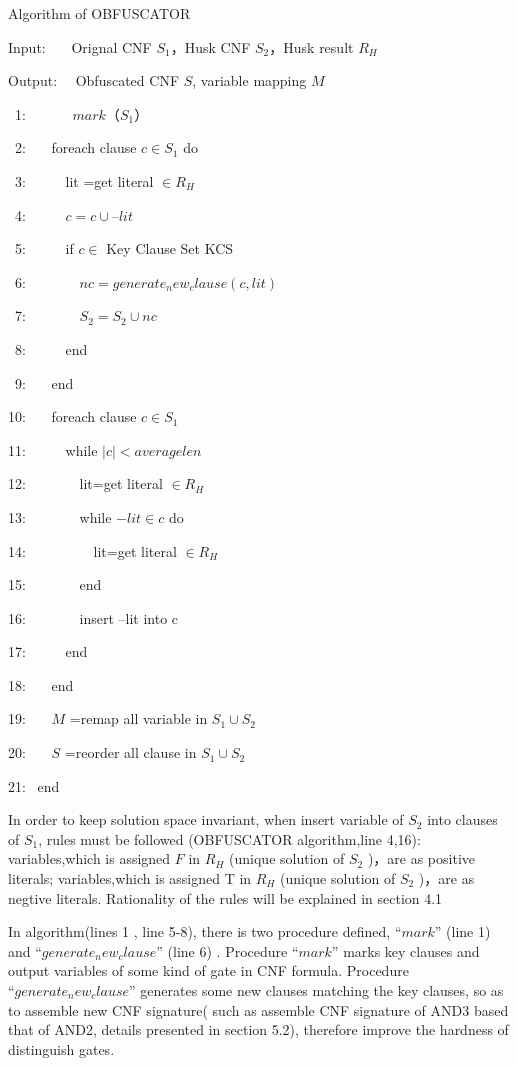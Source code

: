 \documentclass[runningheads,a4paper]{llncs}
\begin{document}
\noindent Algorithm of OBFUSCATOR

Input:~~~ Orignal CNF $S_1$，Husk CNF $S_2$，Husk result $R_H$

Output:~~ Obfuscated CNF $S$, variable mapping $M$ 


~1:~~~~~~   $mark（S_1）$


~2:~~~  foreach clause $c \in S_1$  do

~3:~~~~~      lit =get literal $ \in R_H$

~4:~~~~~      $c=c \cup –lit$


~5:~~~~~         if  $c \in$  Key Clause Set KCS

~6:~~~~~~~           $nc=generate_new_clause(c,lit)$

~7:~~~~~~~           $S_2=S_2 \cup nc$

~8:~~~~~         end  


~9:~~~  end 

10:~~~  foreach clause $ c \in S_1 $

11:~~~~~	    while $ |c| < averagelen $ 

12:~~~~~~~    	 lit=get literal $\in R_H$

13:~~~~~~~    	 while $-lit \in c$ do

14:~~~~~~~~~          lit=get literal $ \in R_H $

15:~~~~~~~        end 

16:~~~~~~~	      insert –lit into c

17:~~~~~     end 

18:~~~   end 

19:~~~   $M$ =remap all variable in $ S_1 \cup S_2$

20:~~~   $S$ =reorder all clause in $S_1 \cup S_2$

21:~  end

In order to keep solution space invariant, when insert variable of $S_2$ into clauses of $S_1$, rules must be followed (OBFUSCATOR algorithm,line 4,16):
variables,which is assigned $F$ in $R_H$ (unique solution of $S_2$ )，are as positive literals;
variables,which is assigned T in $R_H$ (unique solution of $S_2$ )，are as negtive literals. 
Rationality of the rules will be explained in section 4.1

In algorithm(lines 1 , line 5-8), there is two procedure defined, $“mark”$ (line 1) and $“generate_new_clause”$ (line 6) . 
Procedure $“mark”$ marks key clauses and output variables of some kind of gate in CNF formula.
Procedure $“generate_new_clause”$ generates some new clauses matching the key clauses, so as to  assemble new CNF signature( such as assemble CNF signature of AND3 based that of AND2, 
details presented in section 5.2), therefore improve the hardness of distinguish gates.
\end{document}

